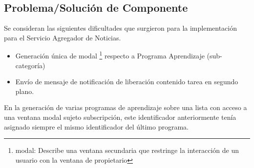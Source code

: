 \subsection{Problema/Soluci\'{o}n de Componente}

Se consideran las siguientes dificultades que surgieron para la implementaci\'{o}n
para el Servicio Agregador de Noticias.

\begin{itemize}

\item Generaci\'{o}n \'{u}nica de modal \footnote{modal: Describe una ventana
secundaria que restringe la interacci\'{o}n de un usuario con la ventana de 
propietario} respecto a Programa Aprendizaje (sub-categor\'{i}a)
\item Env\'{i}o de mensaje de notificaci\'{o}n de liberaci\'{o}n contenido tarea
en segundo plano. 

\end{itemize}

En la generaci\'{o}n de varias programas de aprendizaje sobre una lista con acceso a
una ventana modal sujeto subscripci\'{o}n, este identificador anteriormente
ten\'{i}a asignado siempre el mismo identificador del \'{u}ltimo programa.

